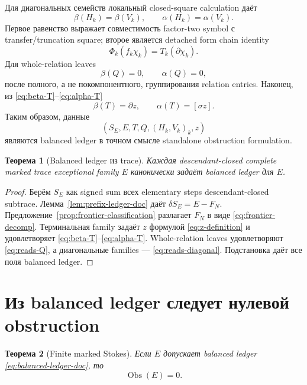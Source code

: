 \documentclass[11pt,a4paper]{article}
\newtheorem{theorem}{Теорема}[section]
\theoremstyle{definition}
\theoremstyle{remark}
\newcommand{\Obs}{\operatorname{Obs}}
\begin{document}
Для диагональных семейств локальный closed-square calculation даёт
\begin{equation}\label{eq:reads-diagonal}
 \beta(H_k)=\beta(V_k),
 \qquad
 \alpha(H_k)=\alpha(V_k).
\end{equation}
Первое равенство выражает совместимость factor-two symbol с
transfer/truncation square; второе является detached form chain identity
\[
 \Phi_k(f_k\chi_k)=T_k(\partial\chi_k).
\]
Для whole-relation leaves
\begin{equation}\label{eq:reads-Q}
 \beta(Q)=0,
 \qquad
 \alpha(Q)=0,
\end{equation}
после полного, а не покомпонентного, группирования relation entries.
Наконец, из \eqref{eq:beta-T}--\eqref{eq:alpha-T}
\[
 \beta(T)=\partial z,
 \qquad
 \alpha(T)=[\sigma z].
\]
Таким образом, данные
\[
 (S_E,E,T,Q,(H_k,V_k)_k,z)
\]
являются balanced ledger в точном смысле standalone obstruction formulation.

\begin{theorem}[Balanced ledger из trace]\label{thm:trace-balanced}
Каждая descendant-closed complete marked trace exceptional family $E$
канонически задаёт balanced ledger для $E$.
\end{theorem}

\begin{proof}
Берём $S_E$ как signed sum всех elementary steps descendant-closed subtrace.
Лемма~\ref{lem:prefix-ledger-doc} даёт
$\delta S_E=E-F_N$. Предложение~\ref{prop:frontier-classification}
разлагает $F_N$ в виде \eqref{eq:frontier-decomp}. Терминальная family задаёт
$z$ формулой \eqref{eq:z-definition} и удовлетворяет
\eqref{eq:beta-T}--\eqref{eq:alpha-T}. Whole-relation leaves удовлетворяют
\eqref{eq:reads-Q}, а диагональные families ---
\eqref{eq:reads-diagonal}. Подстановка даёт все поля balanced ledger.
\end{proof}

\section{Из balanced ledger следует нулевой obstruction}

\begin{theorem}[Finite marked Stokes]\label{thm:stokes-doc}
Если $E$ допускает balanced ledger
\eqref{eq:balanced-ledger-doc}, то
\[
 \Obs(E)=0.
\]
\end{theorem}
\end{document}
